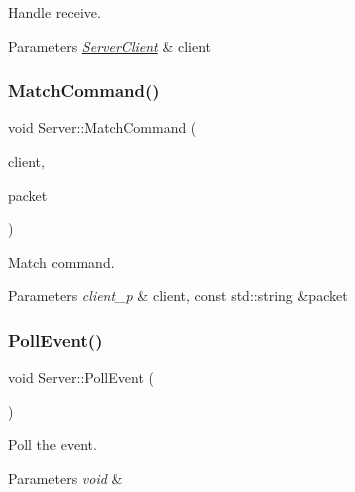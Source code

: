Handle receive. 


\begin{DoxyParams}{Parameters}
{\em \hyperlink{class_server_client}{Server\+Client}} & client \\
\hline
\end{DoxyParams}
\mbox{\label{classns_1_1_server_a99e12a7ee8a2bc21ada58e6870990189}} 
\subsubsection{\texorpdfstring{Match\+Command()}{MatchCommand()}}
{\footnotesize\ttfamily void Server\+::\+Match\+Command (\begin{DoxyParamCaption}\item[{client\+\_\+p}]{client,  }\item[{const std\+::string \&}]{packet }\end{DoxyParamCaption})}



Match command. 


\begin{DoxyParams}{Parameters}
{\em client\+\_\+p} & client, const std\+::string \&packet \\
\hline
\end{DoxyParams}
\mbox{\label{classns_1_1_server_a9e8e68bd5147b294ed9a0d23c1189f6d}} 
\subsubsection{\texorpdfstring{Poll\+Event()}{PollEvent()}}
{\footnotesize\ttfamily void Server\+::\+Poll\+Event (\begin{DoxyParamCaption}{ }\end{DoxyParamCaption})}



Poll the event. 


\begin{DoxyParams}{Parameters}
{\em void} & \\
\hline
\end{DoxyParams}
\mbox{\label{classns_1_1_server_a101fc02efc9caec89146f34619c03e95}} 
